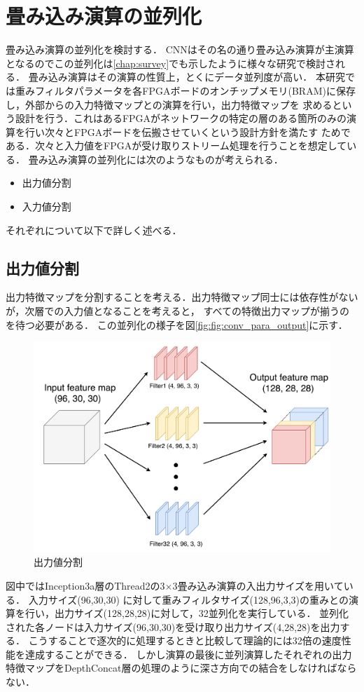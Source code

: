 {\section{畳み込み演算の並列化}
\label{sec:conv_para}
畳み込み演算の並列化を検討する．
CNNはその名の通り畳み込み演算が主演算となるのでこの並列化は\ref{chap:survey}でも示したように様々な研究で検討される．
畳み込み演算はその演算の性質上，とくにデータ並列度が高い．
本研究では重みフィルタパラメータを各FPGAボードのオンチップメモリ(BRAM)に保存し，外部からの入力特徴マップとの演算を行い，出力特徴マップを
求めるという設計を行う．これはあるFPGAがネットワークの特定の層のある箇所のみの演算を行い次々とFPGAボードを伝搬させていくという設計方針を満たす
ためである．次々と入力値をFPGAが受け取りストリーム処理を行うことを想定している．
畳み込み演算の並列化には次のようなものが考えられる．
\begin{itemize}
    \item 出力値分割
    \item 入力値分割
\end{itemize}
それぞれについて以下で詳しく述べる．
\subsection{出力値分割}
\label{subsec:para_output}
出力特徴マップを分割することを考える．出力特徴マップ同士には依存性がないが，次層での入力値となることを考えると，
すべての特徴出力マップが揃うのを待つ必要がある．
この並列化の様子を図\ref{fig:fig:conv_para_output}に示す．
\begin{figure}[h]
    \centering
    \includegraphics[width=12cm]{./chap5/fig/conv_para_output.pdf}
    \caption{出力値分割}
    \label{fig:conv_para_output}
\end{figure}
図中ではInception3a層のThread2の3$\times$3畳み込み演算の入出力サイズを用いている．
入力サイズ(96,30,30) に対して重みフィルタサイズ(128,96,3,3)の重みとの演算を行い，出力サイズ(128,28,28)に対して，32並列化を実行している．
並列化された各ノードは入力サイズ(96,30,30)を受け取り出力サイズ(4,28,28)を出力する．
こうすることで逐次的に処理するときと比較して理論的には32倍の速度性能を達成することができる．
しかし演算の最後に並列演算したそれぞれの出力特徴マップをDepthConcat層の処理のように深さ方向での結合をしなければならない．
}
